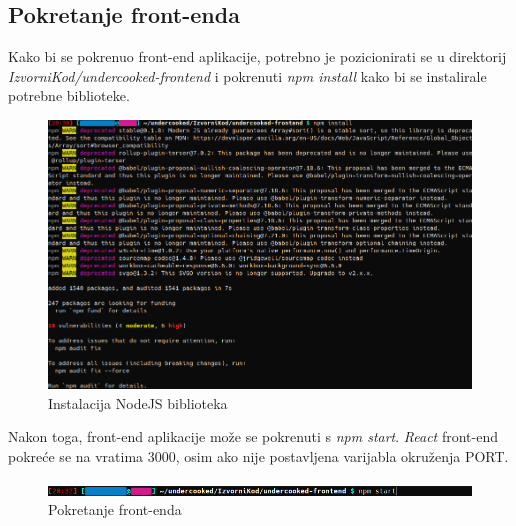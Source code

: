 			\subsection{Pokretanje front-enda}
			Kako bi se pokrenuo front-end aplikacije, potrebno je pozicionirati se u direktorij \textit{IzvorniKod/undercooked-frontend} i pokrenuti \textit{npm install} kako bi se instalirale potrebne biblioteke.
			\begin{figure}[H]
				\includegraphics[scale=0.6]{slike/instalacija_3.png} %
				\centering
				\caption{Instalacija NodeJS biblioteka}
				\label{fig:Instalacija NodeJS biblioteka}
			\end{figure}
			Nakon toga, front-end aplikacije može se pokrenuti s \textit{npm start}. \textit{React} front-end pokreće se na vratima 3000, osim ako nije postavljena varijabla okruženja PORT.
			\begin{figure}[H]
				\includegraphics[scale=0.7]{slike/instalacija_4.png} %
				\centering
				\caption{Pokretanje front-enda}
				\label{fig:Pokretanje front-enda}
			\end{figure}
